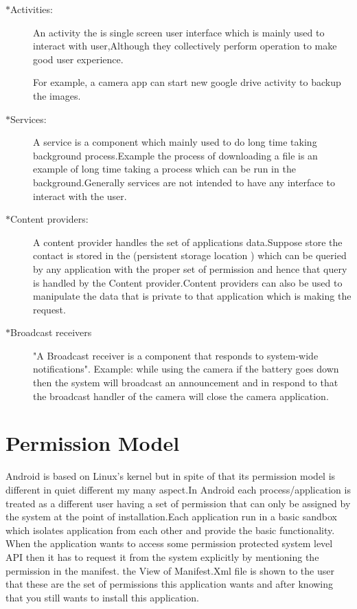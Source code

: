\documentclass[11pt]{report}
\begin{document}
\begin{description}
 \item[$\ast$Activities:] An activity the is single screen user interface which is mainly used to interact with user,Although they collectively perform operation to make good user experience.
 \par
 For example, a camera app can start new google drive activity to backup the images. 
 \item[$\ast$Services:]A service is a component which mainly used to do long time taking background process.Example the process of downloading a file is an example of long time taking a process 
 which can be run in the background.Generally services are not intended to have any interface to interact with the user.

 \item[$\ast$Content providers:]A content provider handles the set of applications data.Suppose store the contact is stored in the (persistent storage  location ) which can be queried  by any application 
  with the proper set of permission and hence that query is handled by the Content provider.Content providers can also be used to manipulate the data that is private to that application which is making the request.


 \item[$\ast$Broadcast receivers] "A Broadcast receiver is a component that responds to system-wide notifications".\cite{fun}
 Example: while using the camera if the battery goes down then the system will broadcast an announcement and in respond to that the broadcast handler of the camera will close the camera application.
\end{description}
\section{Permission Model}
Android is based on Linux's kernel but in spite of that its permission model is different in quiet different my many aspect.In Android each process/application is treated as a different user having a set of permission that 
can only be assigned by the system at the point of installation.Each application run in a basic sandbox which isolates application from each other and provide the basic functionality.
When the application wants to access some permission protected system level API then it has to request it from the system explicitly by mentioning the permission in the manifest.
the View of Manifest.Xml file is shown to the user that these are the set of permissions this application wants and after knowing that you still wants to install this application.
\end{document}
